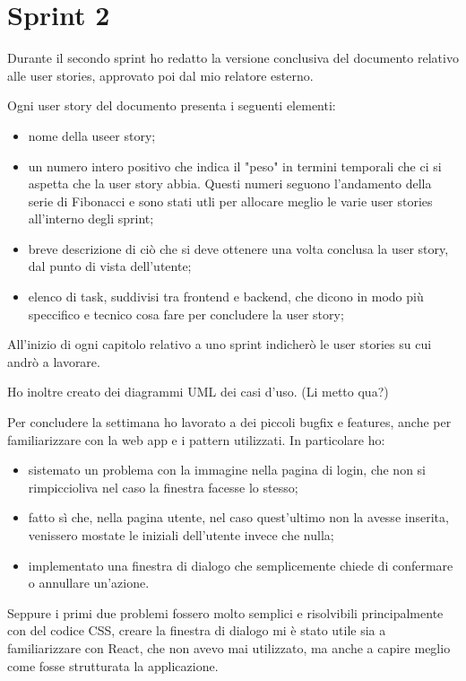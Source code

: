 
\chapter{Sprint 2}
\label{cap:sprint2}

Durante il secondo sprint ho redatto la versione conclusiva del documento relativo alle user stories, approvato poi dal mio relatore esterno.

\noindent Ogni user story del documento presenta i seguenti elementi:
\begin{itemize}
  \item nome della useer story;
  \item un numero intero positivo che indica il "peso" in termini temporali che ci si aspetta che la user story abbia. Questi numeri seguono l'andamento della serie di Fibonacci e sono stati utli per allocare meglio le varie user stories all'interno degli sprint; 
  \item breve descrizione di ciò che si deve ottenere una volta conclusa la user story, dal punto di vista dell'utente;
  \item elenco di task, suddivisi tra frontend e backend, che dicono in modo più speccifico e tecnico cosa fare per concludere la user story;
\end{itemize}

\noindent All'inizio di ogni capitolo relativo a uno sprint indicherò le user stories su cui andrò a lavorare.

Ho inoltre creato dei diagrammi UML dei casi d'uso. (Li metto qua?)

Per concludere la settimana ho lavorato a dei piccoli bugfix e features, anche per familiarizzare con la web app e i pattern utilizzati.
In particolare ho: 
\begin{itemize}
  \item sistemato un problema con la immagine nella pagina di login, che non si rimpiccioliva nel caso la finestra facesse lo stesso;
  \item fatto sì che, nella pagina utente, nel caso quest'ultimo non la avesse inserita, venissero mostate le iniziali dell'utente invece che nulla;
  \item implementato una finestra di dialogo che semplicemente chiede di confermare o annullare un'azione.
\end{itemize}

Seppure i primi due problemi fossero molto semplici e risolvibili principalmente con del codice CSS, creare la finestra di dialogo mi è stato utile sia a familiarizzare con React, che non avevo mai utilizzato, ma anche a capire meglio come fosse strutturata la applicazione.
